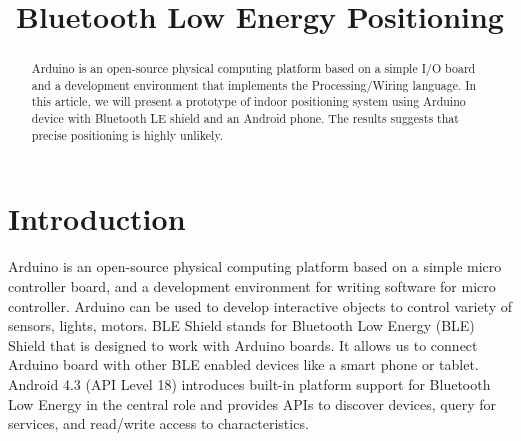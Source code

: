 \documentclass[conference,a4paper]{../../sty/IEEEtran}
\begin{document}
%
\title{Bluetooth Low Energy Positioning}


\author{
}


\maketitle


\begin{abstract}

Arduino is an open-source physical computing platform based on a simple I/O board and a development environment that implements the Processing/Wiring language.
In this article, we will present a prototype of indoor positioning system using Arduino device with Bluetooth LE shield and an Android phone.
The results suggests that precise positioning is highly unlikely.

\end{abstract}




\section{Introduction}
Arduino is an open-source physical computing platform based on a simple micro controller board, and a development environment for writing software for micro controller.
Arduino can be used to develop interactive objects to control variety of sensors, lights, motors. BLE Shield stands for Bluetooth Low Energy (BLE) Shield \cite{ble} that is designed to work with Arduino boards.
It allows us to connect Arduino board with other BLE enabled devices like a smart phone or tablet.
Android 4.3 (API Level 18) introduces built-in platform support for Bluetooth Low Energy in the central role and provides APIs to discover devices, query for services, and read/write access to characteristics.
\end{document}

